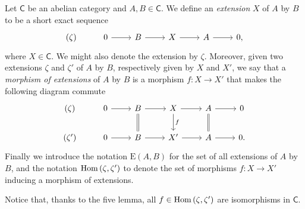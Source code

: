 \begin{defn}[Extension]
	Let $\mathsf{C}$ be an abelian category and $A,B \in \mathsf{C}$.
	We define an \emph{extension} $X$ of $A$ by $B$ to be a short exact sequence
	\begin{equation*}
	\begin{tikzcd}
		(\zeta) &
		0 \arrow[r, "", rightarrow] &
		B \arrow[r, "", rightarrow] &
		X \arrow[r, "", rightarrow] &
		A \arrow[r, "", rightarrow] &
		0
	,\end{tikzcd}
	\end{equation*}
	where $X \in \mathsf{C}$.
	We might also denote the extension by $\zeta$.
	Moreover, given two extensions $\zeta$ and $\zeta'$ of $A$ by $B$,
	respectively given by $X$ and $X'$, we say that a \emph{morphism of extensions} of $A$ by $B$
	is a morphism $f\colon X \to X'$ that makes the following diagram commute
	\begin{equation*}
	\begin{tikzcd}
		(\zeta) &
		0 \arrow[r, "", rightarrow] &
		B \arrow[r, "", rightarrow] 
		\arrow[d, "", equals] &
		X \arrow[r, "", rightarrow] 
		\arrow[d, "f", rightarrow] &
		A \arrow[r, "", rightarrow] 
		\arrow[d, "", equals] &
		0\\
		(\zeta') &
		0 \arrow[r, "", rightarrow] &
		B \arrow[r, "", rightarrow] &
		X' \arrow[r, "", rightarrow] &
		A \arrow[r, "", rightarrow] &
		0
	.\end{tikzcd}
	\end{equation*}
	Finally we introduce the notation $\mathrm{E}(A,B)$ for the set of all extensions
	of $A$ by $B$, and the notation $\operatorname{Hom} \left( \zeta, \zeta' \right)$
	to denote the set of morphisms $f\colon X \to X'$ inducing a morphism of extensions.
\end{defn}


\begin{rem}[]
	Notice that, thanks to the five lemma, all $f \in \operatorname{Hom} 
	\left( \zeta, \zeta' \right)$ are isomorphisms in $\mathsf{C}$.
\end{rem}


